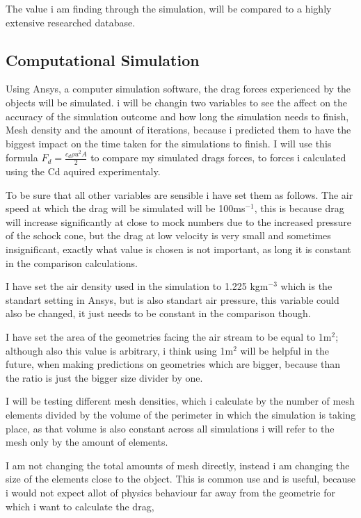 \documentclass[12pt,a4paper]{article}
\begin{document}
The value i am finding through the simulation, will be compared to a highly extensive researched database.

\subsection{Computational Simulation}

Using Ansys, a computer simulation software, the drag forces experienced by the objects will be simulated. i will be changin two variables to see the affect on the accuracy of the simulation outcome and how long the simulation needs to finish, Mesh density and the amount of iterations, because i predicted them to have the biggest impact on the time taken for the simulations to finish. I will use this formula $F_d = \frac{c_d \rho u^2 A}{2}$ to compare my simulated drags forces, to forces i calculated using the Cd aquired experimentaly. 

To be sure that all other variables are sensible i have set them as follows. The air speed at which the drag will be simulated will be 100ms$^{-1}$, this is because drag will increase significantly at close to mock numbers due to the increased pressure of the schock cone, but the drag at low velocity is very small and sometimes insignificant, exactly what value is chosen is not important, as long it is constant in the comparison calculations. 

I have set the air density used in the simulation to 1.225 kgm$^{-3}$ which is the standart setting in Ansys, but is also standart air pressure, this variable could also be changed, it just needs to be constant in the comparison though.

 I have set the area of the geometries facing the air stream to be equal to 1m$^2$; although also this value is arbitrary, i think using 1m$^2$ will be helpful in the future, when making predictions on geometries which are bigger, because than the ratio is just the bigger size divider by one. 

I will be testing different mesh densities, which i calculate by the number of mesh elements divided by the volume of the perimeter in which the simulation is taking place, as that volume is also constant across all simulations i will refer to the mesh only by the amount of elements.

I am not changing the total amounts of mesh directly, instead i am changing the size of the elements close to the object. This is common use and is useful, because i would not expect allot of physics behaviour far away from the geometrie for which i want to calculate the drag, 
\end{document}
